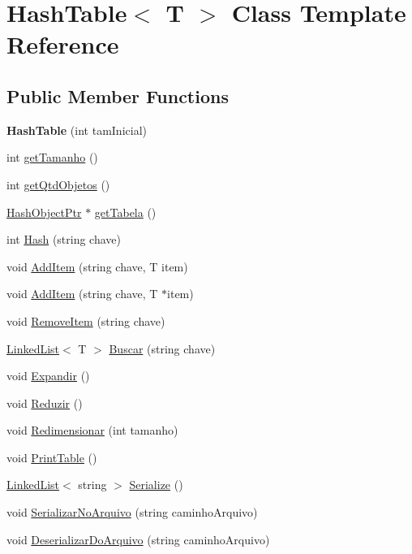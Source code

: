 \hypertarget{class_hash_table}{}\section{Hash\+Table$<$ T $>$ Class Template Reference}
\label{class_hash_table}
\subsection*{Public Member Functions}
\begin{DoxyCompactItemize}
\item 
{\bfseries Hash\+Table} (int tam\+Inicial)\hypertarget{class_hash_table_a0078c8d8bfd666016471af6bf61729f6}{}\label{class_hash_table_a0078c8d8bfd666016471af6bf61729f6}

\item 
int \hyperlink{class_hash_table_ac93583320296c5f4873876403dcc670c}{get\+Tamanho} ()
\item 
int \hyperlink{class_hash_table_a201014e7ddafc6eac9afce5dcce32ed5}{get\+Qtd\+Objetos} ()
\item 
\hyperlink{class_hash_object}{Hash\+Object\+Ptr} $\ast$ \hyperlink{class_hash_table_a8ac77a7d72554f9695c654ab904ad98b}{get\+Tabela} ()
\item 
int \hyperlink{class_hash_table_a7e700a0cce1fdbc1b7a960e3cae4b5fd}{Hash} (string chave)
\item 
void \hyperlink{class_hash_table_aaa0d01393a2a520983a3e1c9cde7d772}{Add\+Item} (string chave, T item)
\item 
void \hyperlink{class_hash_table_ad68b1919c8c5253d9a65a4322839536a}{Add\+Item} (string chave, T $\ast$item)
\item 
void \hyperlink{class_hash_table_a6e60fb4f0dafb682760aa9d68f3e6a4c}{Remove\+Item} (string chave)
\item 
\hyperlink{class_linked_list}{Linked\+List}$<$ T $>$ \hyperlink{class_hash_table_a35806c4c18feafc59ce781a375ef87ff}{Buscar} (string chave)
\item 
void \hyperlink{class_hash_table_ad503bababb5b37994fa49206c05c8f48}{Expandir} ()
\item 
void \hyperlink{class_hash_table_ae66da715339d7e03c6554528e2da88bd}{Reduzir} ()
\item 
void \hyperlink{class_hash_table_a3a14c48fbd3548880c4caea070442d79}{Redimensionar} (int tamanho)
\item 
void \hyperlink{class_hash_table_a8af7e9205fdfd4c8f606844f4a0e04af}{Print\+Table} ()
\item 
\hyperlink{class_linked_list}{Linked\+List}$<$ string $>$ \hyperlink{class_hash_table_abdd027f0d88887cedcfb60aaf883a7db}{Serialize} ()
\item 
void \hyperlink{class_hash_table_ae0b7b2f3d90446e4f06e1206219a9c98}{Serializar\+No\+Arquivo} (string caminho\+Arquivo)
\item 
void \hyperlink{class_hash_table_a571ccd4c73d1dc73837b903569127e2f}{Deserializar\+Do\+Arquivo} (string caminho\+Arquivo)
\end{DoxyCompactItemize}


